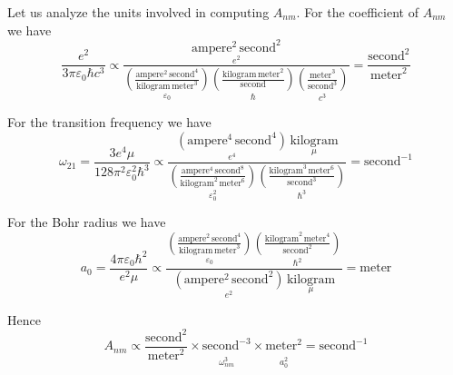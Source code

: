 \documentclass[12pt]{article}
\begin{document}
\noindent
Let us analyze the units involved in computing $A_{nm}$.
For the coefficient of $A_{nm}$ we have
\begin{equation*}
\frac{e^2}{3\pi\varepsilon_0\hbar c^3}\propto
\frac{
\underset{e^2}
{\text{ampere}^2\,\text{second}^2}
}
{
\underset{\varepsilon_0}
{\left(\frac{\text{ampere}^2\,\text{second}^4}{\text{kilogram}\,\text{meter}^3}\right)}
\underset{\hbar}
{\left(\frac{\text{kilogram}\,\text{meter}^2}{\text{second}}\right)}
\underset{c^3}
{\left(\frac{\text{meter}^3}{\text{second}^3}\right)}
}
=\frac{\text{second}^2}{\text{meter}^2}
\end{equation*}

\noindent
For the transition frequency we have
\begin{equation*}
\omega_{21}=
\frac{3e^4\mu}{128\pi^2\varepsilon_0^2\hbar^3}
\propto
\frac{
\underset{e^4}
{\left(\text{ampere}^4\,\text{second}^4\right)}
\,
\underset{\mu}
{\text{kilogram}}
}
{
\underset{\varepsilon_0^2}
{\left(\frac{\text{ampere}^4\,\text{second}^8}{\text{kilogram}^2\,\text{meter}^6}\right)}
\underset{\hbar^3}
{\left(\frac{\text{kilogram}^3\,\text{meter}^6}{\text{second}^3}\right)}
}
=\text{second}^{-1}
\end{equation*}

\noindent
For the Bohr radius we have
\begin{equation*}
a_0=\frac{4\pi\varepsilon_0\hbar^2}{e^2\mu}
\propto
\frac
{
\underset{\varepsilon_0}
{\left(\frac{\text{ampere}^2\,\text{second}^4}{\text{kilogram}\,\text{meter}^3}\right)}
\underset{\hbar^2}
{\left(\frac{\text{kilogram}^2\,\text{meter}^4}{\text{second}^2}\right)}
}
{
\underset{e^2}
{\left(\text{ampere}^2\,\text{second}^2\right)}
\,
\underset{\mu}
{\text{kilogram}}
}
=\text{meter}
\end{equation*}

\noindent
Hence
\begin{equation*}
A_{nm}\propto
\frac{\text{second}^2}{\text{meter}^2}
\times
\underset{\substack{\\[1ex]\omega_{nm}^3}}{\text{second}^{-3}}
\times
\underset{\substack{\\[1ex]a_0^2}}{\text{meter}^2}
=\text{second}^{-1}
\end{equation*}
\end{document}
